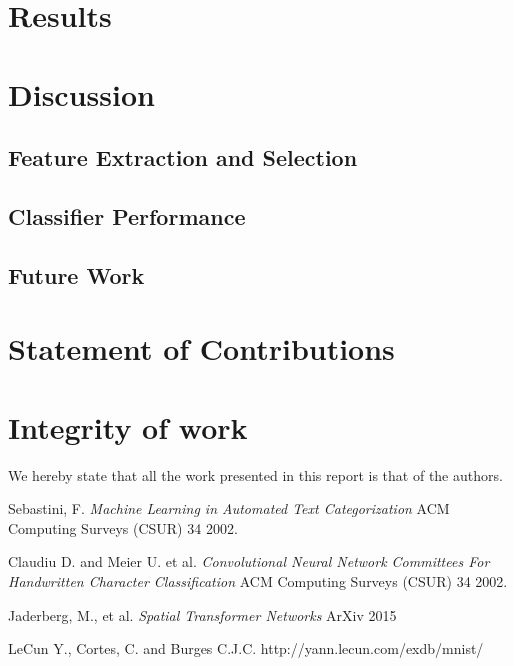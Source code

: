 \documentclass[conference]{IEEEtran}
\begin{document}
\section{Results}




\section{Discussion}

\subsection{Feature Extraction and Selection}



\subsection{Classifier Performance}

\subsection{Future Work}



\section{Statement of Contributions}

\section{Integrity of work}
We hereby state that all the work presented in this report is that of the authors.
\begin{thebibliography}{9}

 Sebastini, F.
  \emph{Machine Learning in Automated Text Categorization}
  ACM Computing Surveys (CSUR) 34
  2002.

 Claudiu D. and Meier U. et al.
  \emph{Convolutional Neural Network Committees For Handwritten Character
Classification}
  ACM Computing Surveys (CSUR) 34
  2002.

 Jaderberg, M., et al.
  \emph{Spatial Transformer Networks}
  ArXiv
  2015

LeCun Y., Cortes, C. and Burges C.J.C.
	http://yann.lecun.com/exdb/mnist/

\end{thebibliography}
\end{document}
